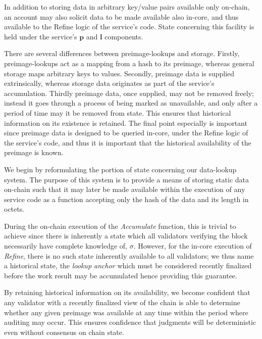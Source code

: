 In addition to storing data in arbitrary key/value pairs available only on-chain, an account may also solicit data to be made available also in-core, and thus available to the Refine logic of the service's code. State concerning this facility is held under the service's $\mathbf{p}$ and $\mathbf{l}$ components.

There are several differences between preimage-lookups and storage. Firstly, preimage-lookups act as a mapping from a hash to its preimage, whereas general storage maps arbitrary keys to values. Secondly, preimage data is supplied extrinsically, whereas storage data originates as part of the service's accumulation. Thirdly preimage data, once supplied, may not be removed freely; instead it goes through a process of being marked as unavailable, and only after a period of time may it be removed from state. This ensures that historical information on its existence is retained. The final point especially is important since preimage data is designed to be queried in-core, under the Refine logic of the service's code, and thus it is important that the historical availability of the preimage is known.

We begin by reformulating the portion of state concerning our data-lookup system. The purpose of this system is to provide a means of storing static data on-chain such that it may later be made available within the execution of any service code as a function accepting only the hash of the data and its length in octets.

During the on-chain execution of the \emph{Accumulate} function, this is trivial to achieve since there is inherently a state which all validators verifying the block necessarily have complete knowledge of, \ie $\sigma$. However, for the in-core execution of \emph{Refine}, there is no such state inherently available to all validators; we thus name a historical state, the \emph{lookup anchor} which must be considered recently finalized before the work result may be accumulated hence providing this guarantee.

By retaining historical information on its availability, we become confident that any validator with a recently finalized view of the chain is able to determine whether any given preimage was available at any time within the period where auditing may occur. This ensures confidence that judgments will be deterministic even without consensus on chain state.

